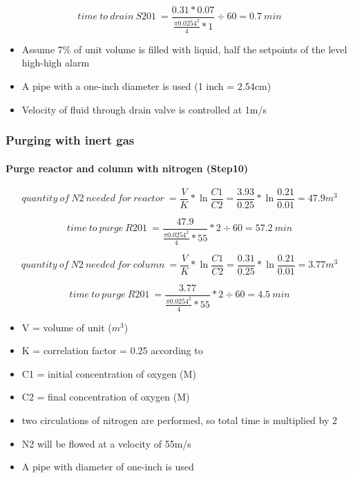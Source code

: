     \begin{equation}
        time\:to\:drain\:S201\:=\frac{0.31 * 0.07}{\frac{\pi 0.0254^2}{4} * 1} \div 60 =0.7\:min
    \end{equation}
    
    \begin{itemize}
        \item Assume 7\% of unit volume is filled with liquid, half the setpoints of the level high-high alarm
        \item A pipe with a one-inch diameter is used (1 inch = 2.54cm)
        \item Velocity of fluid through drain valve is controlled at 1m/s
    \end{itemize}

\subsubsection{Purging with inert gas} 
\paragraph{Purge reactor and column with nitrogen (Step10)}

    \begin{equation}
        quantity\:of\:N2\:needed\:for\:reactor\:=\frac{V}{K} * \ln \frac{C1}{C2} = \frac{3.93}{0.25} * \ln \frac{0.21}{0.01} = 47.9 m^3
    \end{equation}
    
    \begin{equation}
        time\:to\:purge\:R201\:=\frac{47.9}{\frac{\pi 0.0254^2}{4} * 55} * 2 \div 60 = 57.2\:min
    \end{equation}
    
    \begin{equation}
        quantity\:of\:N2\:needed\:for\:column\:=\frac{V}{K} * \ln \frac{C1}{C2} = \frac{0.31}{0.25} * \ln \frac{0.21}{0.01} = 3.77 m^3
    \end{equation}
    
    \begin{equation}
        time\:to\:purge\:R201\:=\frac{3.77}{\frac{\pi 0.0254^2}{4} * 55} * 2 \div 60 = 4.5\:min
    \end{equation}
    
    \begin{itemize}
        \item V = volume of unit ($m^3$)
        \item K = correlation factor = 0.25 according to \textcite{}
        \item C1 = initial concentration of oxygen (M)
        \item C2 = final concentration of oxygen (M)
        \item two circulations of nitrogen are performed, so total time is multiplied by 2
        \item N2 will be flowed at a velocity of 55m/s
        \item A pipe with diameter of one-inch is used
    \end{itemize}

